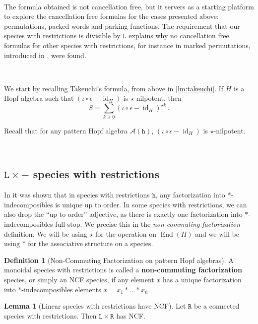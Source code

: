 \documentclass[12pt, reqno]{amsart}
\theoremstyle{definition}
\newtheorem{lm}[thm]{Lemma}
\newtheorem{defin}[thm]{Definition}
\DeclareMathOperator{\id}{id}
\DeclareMathOperator{\End}{\mathrm{End}}
\begin{document}
\

The formula obtained is not cancellation free, but it servers as a starting platform to explore the cancellation free formulas for the cases presented above: permutations, packed words and parking functions. The requirement that our species with restrictions is divisible by $\mathtt{L}$ explains why no cancellation free formulas for other species with restrictions, for instance in marked permutations, introduced in \cite{Penaguiao2020}, were found.

\

We start by recalling Takeuchi's formula, from above in \cref{lm:takeuchi}.
If $H$ is a Hopf algebra such that $(  \iota  \circ\epsilon - \id_H)$ is $\star$-nilpotent, then 
$$S = \sum_{k\geq 0 }  ( \iota  \circ\epsilon- \id_H)^{\star k}\, . $$

Recall that for any pattern Hopf algebra $\mathcal A (\mathtt{h})$, $(\iota\circ \epsilon - \id_H)$ is $\star$-nilpotent. 

\

\subsection{$\mathtt{L}\times -$ species with restrictions}


In \cite[Corollary 3.4.]{Penaguiao2020} it was shown that in species with restrictions $\mathtt{h}$, any factorization into $\ast$-indecomposibles is unique up to order.
In some species with restrictions, we can also drop the ``up to order'' adjective, as there is exactly one factorization into $\ast$-indecomposibles full stop. We precise this in the \textit{non-commuting factorization} definition.
We will be using $\star$ for the operation on $\End (H)$ and we will be using $\ast $ for the associative structure on a species.



\begin{defin}[Non-Commuting Factorization on pattern Hopf algebras]\label{defin:ncf}
A monoidal species with restrictions is called a \textbf{non-commuting factorization} species, or simply an NCF species, if any element $x$ has a unique factorization into $\ast$-indecomposibles elements $x = x_1 \ast \dots \ast x_n$.
\end{defin}


\begin{lm}[Linear species with restrictions have NCF]
Let $\mathtt{R}$ be a connected species with restrictions.
Then $\mathtt{L} \times \mathtt{R}$ has NCF.
\end{lm}
\end{document}

